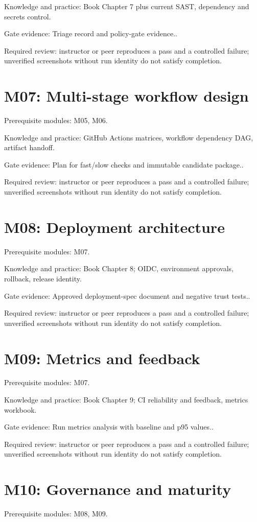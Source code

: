 \documentclass[11pt,letterpaper]{article}
\begin{document}
Knowledge and practice: Book Chapter 7 plus current SAST, dependency and secrets control.

Gate evidence: Triage record and policy-gate evidence..

Required review: instructor or peer reproduces a pass and a controlled failure; unverified screenshots without run identity do not satisfy completion.

\section{M07: Multi-stage workflow design}
Prerequisite modules: M05, M06.

Knowledge and practice: GitHub Actions matrices, workflow dependency DAG, artifact handoff.

Gate evidence: Plan for fast/slow checks and immutable candidate package..

Required review: instructor or peer reproduces a pass and a controlled failure; unverified screenshots without run identity do not satisfy completion.

\section{M08: Deployment architecture}
Prerequisite modules: M07.

Knowledge and practice: Book Chapter 8; OIDC, environment approvals, rollback, release identity.

Gate evidence: Approved deployment-spec document and negative trust tests..

Required review: instructor or peer reproduces a pass and a controlled failure; unverified screenshots without run identity do not satisfy completion.

\section{M09: Metrics and feedback}
Prerequisite modules: M07.

Knowledge and practice: Book Chapter 9; CI reliability and feedback, metrics workbook.

Gate evidence: Run metrics analysis with baseline and p95 values..

Required review: instructor or peer reproduces a pass and a controlled failure; unverified screenshots without run identity do not satisfy completion.

\section{M10: Governance and maturity}
Prerequisite modules: M08, M09.
\end{document}
